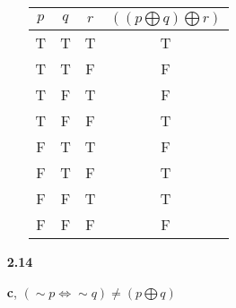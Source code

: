 \documentclass[16pt]{article}
\begin{document}
\begin{enumerate}
\begin{enumerate}
\begin{tabular}{|c|c|c|c|}
        \hline
        $p$ & $q$ & $r$ & $((p \bigoplus q) \bigoplus r)$\\
        \hline
        T & T & T & T \\
        \hline
        T & T & F & F \\
        \hline
        T & F & T & F \\
        \hline
        T & F & F & T \\
        \hline
        F & T & T & F \\
        \hline
        F & T & F & T \\
        \hline
        F & F & T & T \\
        \hline
        F & F & F & F \\
        \hline
    \end{tabular}
    \end{enumerate}
    \item[\textbf{2.14}]
    \item[] \textbf{c}, $(\sim p \Leftrightarrow \sim q) \neq (p \bigoplus q)$
    
    
\end{enumerate}
\end{document}
